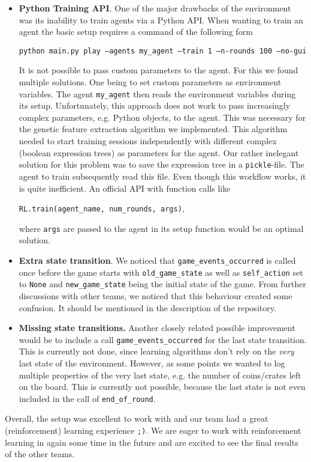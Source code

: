 \begin{itemize}
	\item \textbf{Python Training API}. One of the major drawbacks of the environment was its inability to train agents via a Python API. When wanting to train an agent the basic setup requires a command of the following form
	
		\begin{center}
			\texttt{python main.py play --agents my\_agent --train 1 --n-rounds 100 --no-gui}	
		\end{center}
	
		It is not possible to pass custom parameters to the agent. For this we found multiple solutions. One being to set custom parameters as environment variables. The agent \texttt{my\_agent} then reads the environment variables during its setup. Unfortunately, this approach does not work to pass increasingly complex parameters, e.g. Python objects, to the agent. This was necessary for the genetic feature extraction algorithm we implemented. This algorithm needed to start training sessions independently with different complex (boolean expression trees) as parameters for the agent. Our rather inelegant solution for this problem was to save the expression tree in a \texttt{pickle}-file. The agent to train subsequently read this file. Even though this workflow works, it is quite inefficient. An official API with function calls like
	
		\begin{center}
			\texttt{RL.train(agent\_name, num\_rounds, args)},
		\end{center}
	
		where \texttt{args} are passed to the agent in its setup function would be an optimal solution. 
	
	\item \textbf{Extra state transition}. We noticed that \texttt{game\_events\_occurred} is called once before the game starts with \texttt{old\_game\_state} as well as \texttt{self\_action} set to \texttt{None} and \texttt{new\_game\_state} being the initial state of the game. From further discussions with other teams, we noticed that this behaviour created some confusion. It should be mentioned in the description of the repository. \\
	
	\item \textbf{Missing state transitions.} Another closely related possible improvement would be to include a call \texttt{game\_events\_occurred} for the last state transition. This is currently not done, since learning algorithms don't rely on the \emph{very} last state of the environment. However, as some points we wanted to log multiple properties of the very last state, e.g. the number of coins/crates left on the board. This is currently not possible, because the last state is not even included in the call of \texttt{end\_of\_round}. 
\end{itemize}

Overall, the setup was excellent to work with and our team had a great (reinforcement) learning experience \texttt{;)}. We are eager to work with reinforcement learning in again some time in the future and are excited to see the final results of the other teams. 